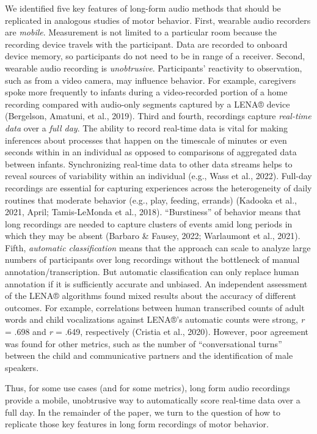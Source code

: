 \documentclass[
  man]{apa6}
\begin{document}
We identified five key features of long-form audio methods that should be replicated in analogous studies of motor behavior. First, wearable audio recorders are \emph{mobile}. Measurement is not limited to a particular room because the recording device travels with the participant. Data are recorded to onboard device memory, so participants do not need to be in range of a receiver. Second, wearable audio recording is \emph{unobtrusive}. Participants' reactivity to observation, such as from a video camera, may influence behavior. For example, caregivers spoke more frequently to infants during a video-recorded portion of a home recording compared with audio-only segments captured by a LENA® device (Bergelson, Amatuni, et al., 2019). Third and fourth, recordings capture \emph{real-time data} over a \emph{full day}. The ability to record real-time data is vital for making inferences about processes that happen on the timescale of minutes or even seconds within in an individual as opposed to comparisons of aggregated data between infants. Synchronizing real-time data to other data streams helps to reveal sources of variability within an individual (e.g., Wass et al., 2022). Full-day recordings are essential for capturing experiences across the heterogeneity of daily routines that moderate behavior (e.g., play, feeding, errands) (Kadooka et al., 2021, April; Tamis-LeMonda et al., 2018). ``Burstiness'' of behavior means that long recordings are needed to capture clusters of events amid long periods in which they may be absent (Barbaro \& Fausey, 2022; Warlaumont et al., 2021). Fifth, \emph{automatic classification} means that the approach can scale to analyze large numbers of participants over long recordings without the bottleneck of manual annotation/transcription. But automatic classification can only replace human annotation if it is sufficiently accurate and unbiased. An independent assessment of the LENA® algorithms found mixed results about the accuracy of different outcomes. For example, correlations between human transcribed counts of adult words and child vocalizations against LENA®'s automatic counts were strong, \emph{r} = .698 and \emph{r} = .649, respectively (Cristia et al., 2020). However, poor agreement was found for other metrics, such as the number of ``conversational turns'' between the child and communicative partners and the identification of male speakers.

Thus, for some use cases (and for some metrics), long form audio recordings provide a mobile, unobtrusive way to automatically score real-time data over a full day. In the remainder of the paper, we turn to the question of how to replicate those key features in long form recordings of motor behavior.
\end{document}
